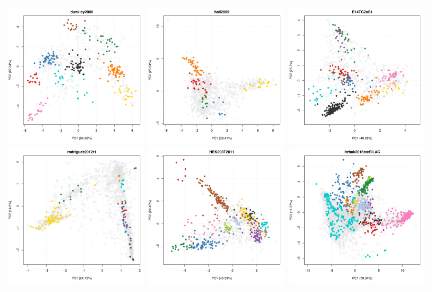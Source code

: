 \documentclass[12pt]{article}\usepackage[]{graphicx}\usepackage[]{color}
\begin{document}
\begin{appendices}
\begin{figure}[htb]
  \includegraphics[width = 0.32\textwidth]{./figure/figpca-17.pdf}
  \includegraphics[width = 0.32\textwidth]{./figure/figpca-18.pdf}
  \includegraphics[width = 0.32\textwidth]{./figure/figpca-19.pdf}
  \includegraphics[width = 0.32\textwidth]{./figure/figpca-20.pdf}
  \includegraphics[width = 0.32\textwidth]{./figure/figpca-21.pdf}
  \includegraphics[width = 0.32\textwidth]{./figure/figpca-22.pdf}

\end{figure}
\end{appendices}
\end{document}
